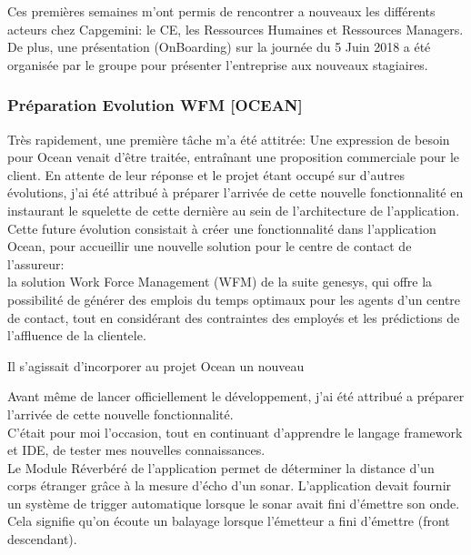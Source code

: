 \documentclass{rapport}
\begin{document}
Ces premières semaines m'ont permis de rencontrer a nouveaux les différents acteurs chez Capgemini: le CE, les Ressources Humaines et Ressources Managers.\\ 

De plus, une présentation (OnBoarding) sur la journée du 5 Juin 2018 a été organisée par le groupe pour présenter l'entreprise aux nouveaux stagiaires.

\subsubsection{Préparation Evolution WFM [OCEAN]}

Très rapidement, une première tâche m'a été attitrée: Une expression de besoin pour Ocean venait d'être traitée, entraînant une proposition commerciale pour le client. En attente de leur réponse et le projet étant occupé sur d'autres évolutions, j'ai été attribué à préparer l'arrivée de cette nouvelle fonctionnalité en instaurant le squelette de cette dernière au sein de l'architecture de l'application.\\

Cette future évolution consistait à créer une fonctionnalité dans l'application Ocean, pour accueillir une nouvelle solution pour le centre de contact de l'assureur: \\
la solution Work Force Management (WFM) de la suite genesys, qui offre la possibilité de générer des emplois du temps optimaux pour les agents d'un centre de contact, tout en considérant des contraintes des employés et les prédictions de l'affluence de la clientele.




Il s'agissait d'incorporer au projet Ocean un nouveau 

Avant même de lancer officiellement le développement, j'ai été attribué a préparer l'arrivée de cette nouvelle fonctionnalité.\\
C'était pour moi l'occasion, tout en continuant d'apprendre le langage framework et IDE, de tester mes nouvelles connaissances.\\

Le Module Réverbéré de l'application permet de déterminer la distance d'un corps étranger grâce à la mesure d'écho d'un sonar. L'application devait fournir un système de trigger automatique lorsque le sonar avait fini d'émettre son onde. Cela signifie qu'on écoute un balayage lorsque l'émetteur a fini d'émettre (front descendant).\\
\end{document}
